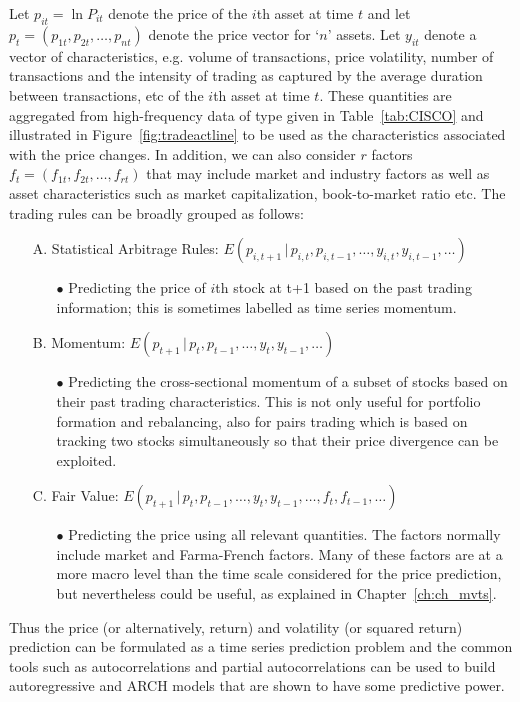 Let $p_{it}= \ln P_{it}$ denote the price of the $i$th asset at time $t$ and let $p_t = (p_{1t}, p_{2t}, \ldots, p_{nt})$ denote the price vector for `$n$' assets. Let $y_{it}$ denote a vector of characteristics, e.g. volume of transactions, price volatility, number of transactions and the intensity of trading as captured by the average duration between transactions, etc of the $i$th asset at time $t$. These quantities are aggregated from high-frequency data of type given in Table~\ref{tab:CISCO} and illustrated in Figure~\ref{fig:tradeactline} to be used as the characteristics associated with the price changes. In addition, we can also consider $r$ factors $f_t = (f_{1t}, f_{2t}, \ldots, f_{rt})$ that may include market and industry factors as well as asset characteristics such as market capitalization, book-to-market ratio etc. The trading rules can be broadly grouped as follows:
        \begin{itemize}
        \item[A.] Statistical Arbitrage Rules: $E(p_{i,t+1}\,|\,p_{i,t},p_{i,t-1},\ldots,y_{i,t},y_{i,t-1},\ldots)$
        \begin{itemize}
        \item[$\bullet$] Predicting the price of $i$th stock at t+1 based on the past trading information; this is sometimes labelled as time series momentum.
        \end{itemize}
        \item[B.] Momentum: $E(p_{t+1}\,|\,p_{t},p_{t-1},\ldots,y_{t},y_{t-1},\ldots)$
        \begin{itemize}
        \item[$\bullet$] Predicting the cross-sectional momentum of a subset of stocks based on their past trading characteristics. This is not only useful for portfolio formation and rebalancing, also for pairs trading which is based on tracking two stocks simultaneously so that their price divergence can be exploited. 
        \end{itemize}
        \item[C.] Fair Value: $E(p_{t+1}\,|\,p_{t},p_{t-1},\ldots,y_{t},y_{t-1},\ldots,f_t,f_{t-1},\ldots)$
        \begin{itemize}
        \item[$\bullet$] Predicting the price using all relevant quantities. The factors normally include market and Farma-French factors. Many of these factors are at a more macro level than the time scale considered for the price prediction, but nevertheless could be useful, as explained in Chapter~\ref{ch:ch_mvts}.
        \end{itemize}
        \end{itemize}
\noindent Thus the price (or alternatively, return) and volatility (or squared return) prediction can be formulated as a time series prediction problem and the common tools such as autocorrelations and partial autocorrelations can be used to build autoregressive and ARCH models that are shown to have some predictive power. 


